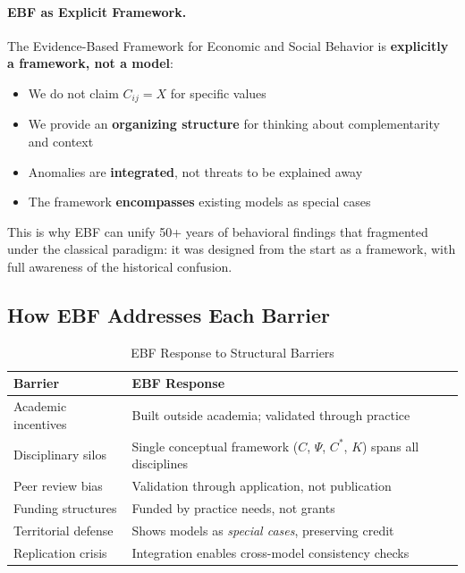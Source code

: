 \paragraph{EBF as Explicit Framework.}
The Evidence-Based Framework for Economic and Social Behavior is \textbf{explicitly a framework, not a model}:
\begin{itemize}[nosep]
    \item We do not claim $C_{ij} = X$ for specific values
    \item We provide an \textbf{organizing structure} for thinking about complementarity and context
    \item Anomalies are \textbf{integrated}, not threats to be explained away
    \item The framework \textbf{encompasses} existing models as special cases
\end{itemize}

This is why EBF can unify 50+ years of behavioral findings that fragmented under the classical paradigm:
it was designed from the start as a framework, with full awareness of the historical confusion.

\subsection{How EBF Addresses Each Barrier}

\begin{table}[htbp]
\centering
\caption{EBF Response to Structural Barriers}
\label{tab:ebf-response}
\renewcommand{\arraystretch}{1.4}
\begin{tabular}{@{}p{4cm}p{8cm}@{}}
\toprule
\textbf{Barrier} & \textbf{EBF Response} \\
\midrule
Academic incentives & Built outside academia; validated through practice \\
Disciplinary silos & Single conceptual framework ($C$, $\Psi$, $C^*$, $K$) spans all disciplines \\
Peer review bias & Validation through application, not publication \\
Funding structures & Funded by practice needs, not grants \\
Territorial defense & Shows models as \textit{special cases}, preserving credit \\
Replication crisis & Integration enables cross-model consistency checks \\
\bottomrule
\end{tabular}
\end{table}

